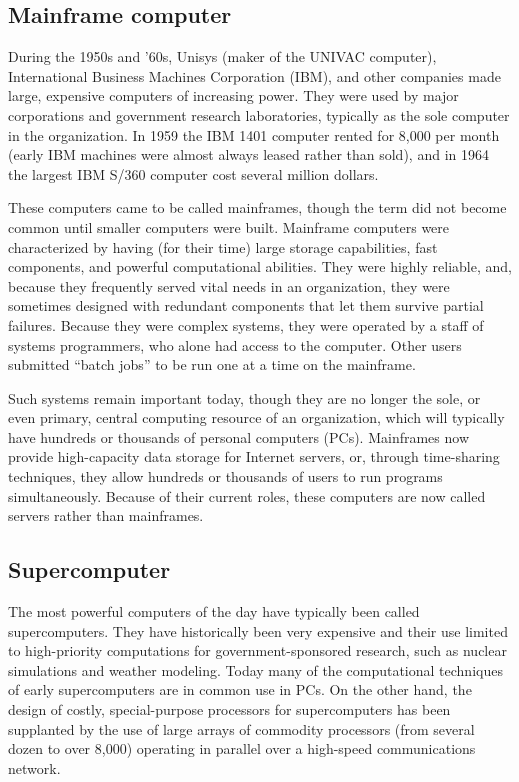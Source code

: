 \documentclass[11pt,a4paper,twoside]{article}
\begin{document}
\subsection{Mainframe computer}
During the 1950s and ’60s, Unisys (maker of the UNIVAC computer), International Business Machines Corporation (IBM), and other companies made large, expensive computers of increasing power. They were used by major corporations and government research laboratories, typically as the sole computer in the organization. In 1959 the IBM 1401 computer rented for 8,000 per month (early IBM machines were almost always leased rather than sold), and in 1964 the largest IBM S/360 computer cost several million dollars.\par
These computers came to be called mainframes, though the term did not become common until smaller computers were built. Mainframe computers were characterized by having (for their time) large storage capabilities, fast components, and powerful computational abilities. They were highly reliable, and, because they frequently served vital needs in an organization, they were sometimes designed with redundant components that let them survive partial failures. Because they were complex systems, they were operated by a staff of systems programmers, who alone had access to the computer. Other users submitted “batch jobs” to be run one at a time on the mainframe.\par
Such systems remain important today, though they are no longer the sole, or even primary, central computing resource of an organization, which will typically have hundreds or thousands of personal computers (PCs). Mainframes now provide high-capacity data storage for Internet servers, or, through time-sharing techniques, they allow hundreds or thousands of users to run programs simultaneously. Because of their current roles, these computers are now called servers rather than mainframes.
\subsection{Supercomputer}
The most powerful computers of the day have typically been called supercomputers. They have historically been very expensive and their use limited to high-priority computations for government-sponsored research, such as nuclear simulations and weather modeling. Today many of the computational techniques of early supercomputers are in common use in PCs. On the other hand, the design of costly, special-purpose processors for supercomputers has been supplanted by the use of large arrays of commodity processors (from several dozen to over 8,000) operating in parallel over a high-speed communications network.
\end{document}
